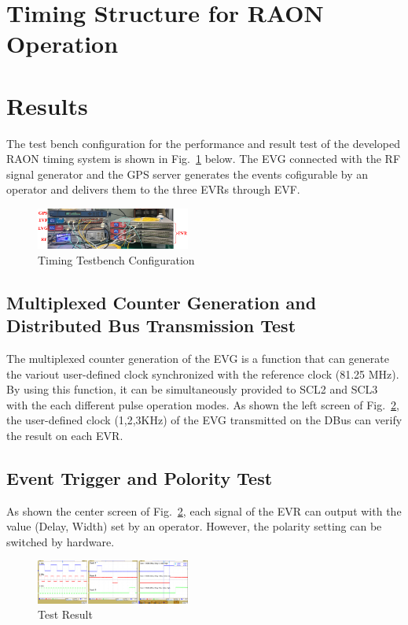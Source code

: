 \documentclass[journal,reqno]{IEEEtran}
\begin{document}
\hfill\break

\section{Timing Structure for RAON Operation}

\section{Results}
The test bench configuration for the performance and result test of the developed RAON timing system is shown in Fig.~\ref{timing_testbench} below. The EVG connected with the RF signal generator and the GPS server generates the events cofigurable by an operator and delivers them to the three EVRs through EVF.

\begin{figure}[!htb]
	\centering
	\includegraphics*[width=0.45\textwidth, height=0.12\textwidth]{img18.png}
	\caption{Timing Testbench Configuration}
	\label{timing_testbench}
\end{figure}

\subsection{Multiplexed Counter Generation and Distributed Bus Transmission Test}
The multiplexed counter generation of the EVG is a function that can generate the variout user-defined clock synchronized with the reference clock (81.25 MHz). By using this function, it can be simultaneously provided to SCL2 and SCL3 with the each different pulse operation modes.
As shown the left screen of Fig.~\ref{timing_result}, the user-defined clock (1,2,3KHz) of the EVG transmitted on the DBus can verify the result on each EVR.

\subsection{Event Trigger and Polority Test}
As shown the center screen of Fig.~\ref{timing_result}, each signal of the EVR can output with the value (Delay, Width) set by an operator.
However, the polarity setting can be switched by hardware.
 
\begin{figure}[!htb]
	\centering
	\includegraphics*[width=0.45\textwidth, height=0.15\textwidth]{img22.png}
	\caption{Test Result}
	\label{timing_result}
\end{figure}
\end{document}
